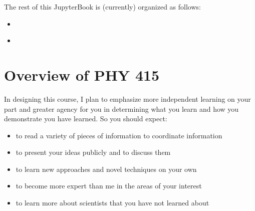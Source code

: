 \documentclass[letterpaper,10pt,english]{jupyterBook}
\begin{document}
\begin{DUlineblock}{0em}
\item[] 
\end{DUlineblock}

\sphinxAtStartPar
The rest of this JupyterBook is (currently) organized as follows:
\begin{itemize}
\item {} 
\sphinxAtStartPar
{\hyperref[\detokenize{content/0_course/syllabus::doc}]{}}

\item {} 
\sphinxAtStartPar
{\hyperref[\detokenize{content/1_modeling/what_is_modeling::doc}]{}}

\end{itemize}

\sphinxstepscope


\chapter{Overview of PHY 415}
\label{\detokenize{content/0_course/syllabus:overview-of-phy-415}}\label{\detokenize{content/0_course/syllabus::doc}}
\sphinxAtStartPar
In designing this course, I plan to emphasize more independent learning on your part and greater agency for you in determining what you learn and how you demonstrate you have learned. So you should expect:
\begin{itemize}
\item {} 
\sphinxAtStartPar
to read a variety of pieces of information to coordinate information

\item {} 
\sphinxAtStartPar
to present your ideas publicly and to discuss them

\item {} 
\sphinxAtStartPar
to learn new approaches and novel techniques on your own

\item {} 
\sphinxAtStartPar
to become more expert than me in the areas of your interest

\item {} 
\sphinxAtStartPar
to learn more about scientists that you have not learned about

\end{itemize}
\end{document}
